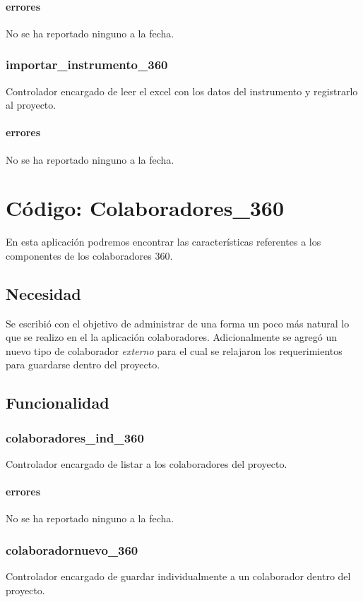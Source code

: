 \documentclass[10pt,a4paper]{book}
\begin{document}
	\subsubsection{errores}
	No se ha reportado ninguno a la fecha.

	\subsection{importar\_instrumento\_360}
	Controlador encargado de leer el excel con los datos del instrumento y registrarlo al proyecto.
	\subsubsection{errores}
	No se ha reportado ninguno a la fecha.


	\chapter{Código: Colaboradores\_360}

	En esta aplicación podremos encontrar las características referentes a los componentes de los colaboradores 360.

	\section{Necesidad}

	Se escribió con el objetivo de administrar de una forma un poco más natural lo que se realizo en el la aplicación colaboradores. Adicionalmente se agregó un nuevo tipo de colaborador \textit{externo} para el cual se relajaron los requerimientos para guardarse dentro del proyecto.

	\section{Funcionalidad}


	\subsection{colaboradores\_ind\_360}
	Controlador encargado de listar a los colaboradores del proyecto.
	\subsubsection{errores}
	No se ha reportado ninguno a la fecha.

	\subsection{colaboradornuevo\_360}
	Controlador encargado de guardar individualmente a un colaborador dentro del proyecto.
\end{document}
